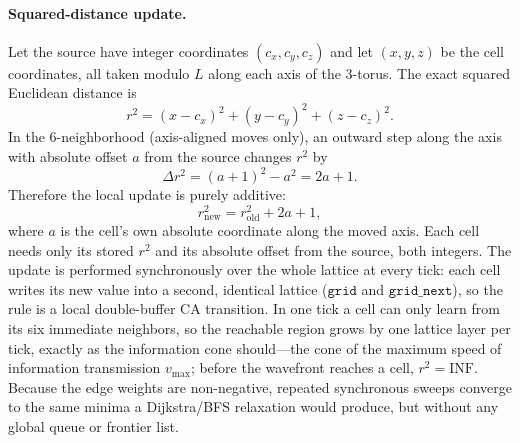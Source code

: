 \documentclass[a4paper]{article}
\begin{document}
\paragraph{Squared-distance update.}
Let the source have integer coordinates $(c_{x},c_{y},c_{z})$ and let $(x,y,z)$ be the cell coordinates, all taken modulo $L$ along each axis of the 3-torus.  The exact squared Euclidean distance is
\[
r^{2}=(x-c_{x})^{2}+(y-c_{y})^{2}+(z-c_{z})^{2}.
\]
In the 6-neighborhood (axis-aligned moves only), an outward step along the axis with absolute offset $a$ from the source changes $r^{2}$ by
\[
\Delta r^{2}=(a+1)^{2}-a^{2}=2a+1.
\]
Therefore the local update is purely additive:
\[
r^{2}_{\text{new}}=r^{2}_{\text{old}}+2a+1,
\]
where $a$ is the cell's own absolute coordinate along the moved axis.  Each cell needs only its stored $r^{2}$ and its absolute offset from the source, both integers.  The update is performed synchronously over the whole lattice at every tick: each cell writes its new value into a second, identical lattice ($\texttt{grid}$ and $\texttt{grid\_next}$), so the rule is a local double-buffer CA transition.  In one tick a cell can only learn from its six immediate neighbors, so the reachable region grows by one lattice layer per tick, exactly as the information cone should---the cone of the maximum speed of information transmission $v_{\max}$; before the wavefront reaches a cell, $r^{2}=\mathrm{INF}$.  Because the edge weights are non-negative, repeated synchronous sweeps converge to the same minima a Dijkstra/BFS relaxation would produce, but without any global queue or frontier list.
\end{document}
